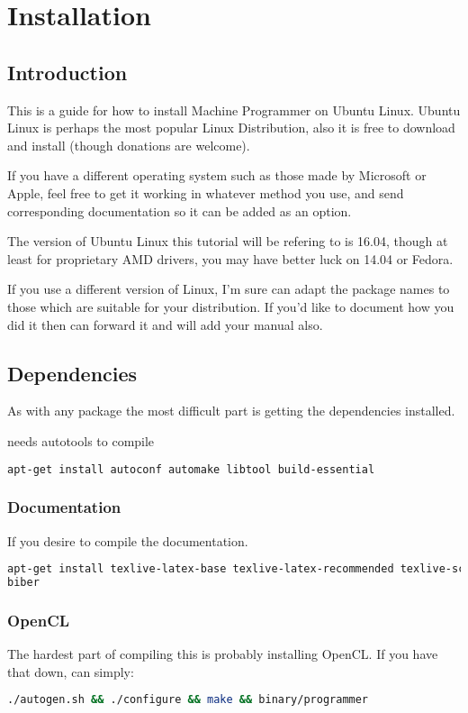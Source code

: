 \documentclass[12pt]{report}
\begin{document}
\chapter{Installation}
\section{Introduction}
This is a guide for how to install Machine Programmer on Ubuntu
Linux\cite{Ubuntu}.
Ubuntu Linux is perhaps the most popular Linux Distribution,
also it is free to download and install (though donations are welcome).

If you have a different operating system such as those made by Microsoft or
Apple, feel free to get it working in whatever method you use, and send
corresponding documentation so it can be added as an option.

The version of Ubuntu Linux this tutorial will be refering to is 16.04,
though at least for proprietary AMD drivers, you may have better luck on 14.04
or Fedora.

If you use a different version of Linux, I'm sure can adapt the package names to
those which are suitable for your distribution.  If you'd like to document how
you did it then can forward it and will add your manual also.

\section{Dependencies}
As with any package the most difficult part is getting the dependencies
installed.

needs autotools to compile
\begin{lstlisting}[language=bash]
apt-get install autoconf automake libtool build-essential
\end{lstlisting}

\subsection{Documentation}
If you desire to compile the documentation.
\begin{lstlisting}[language=bash]
apt-get install texlive-latex-base texlive-latex-recommended texlive-science \
biber
\end{lstlisting}



\subsection{OpenCL}
The hardest part of compiling this is probably installing OpenCL.
If you have that down, can simply:
\begin{lstlisting}[language=bash]
./autogen.sh && ./configure && make && binary/programmer
\end{lstlisting}
\end{document}
